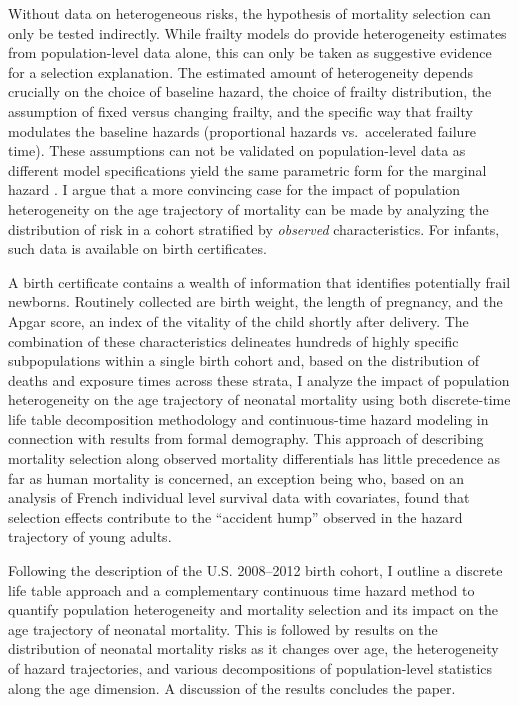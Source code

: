 \documentclass[10pt,twoside,reqno]{article}
\begin{document}
Without data on heterogeneous risks, the hypothesis of mortality selection can only be tested indirectly. While frailty models do provide heterogeneity estimates from population-level data alone, this can only be taken as suggestive evidence for a selection explanation. The estimated amount of heterogeneity depends crucially on the choice of baseline hazard, the choice of frailty distribution, the assumption of fixed versus changing frailty, and the specific way that frailty modulates the baseline hazards (proportional hazards vs.~accelerated failure time). These assumptions can not be validated on population-level data as different model specifications yield the same parametric form for the marginal hazard \citep{Trussell1985, Hoem1990, Yashin2000}. I argue that a more convincing case for the impact of population heterogeneity on the age trajectory of mortality can be made by analyzing the distribution of risk in a cohort stratified by \emph{observed} characteristics. For infants, such data is available on birth certificates.

A birth certificate contains a wealth of information that identifies potentially frail newborns. Routinely collected are birth weight, the length of pregnancy, and the Apgar score, an index of the vitality of the child shortly after delivery. The combination of these characteristics delineates hundreds of highly specific subpopulations within a single birth cohort and, based on the distribution of deaths and exposure times across these strata, I analyze the impact of population heterogeneity on the age trajectory of neonatal mortality using both discrete-time life table decomposition methodology and continuous-time hazard modeling in connection with results from formal demography. This approach of describing mortality selection along observed mortality differentials has little precedence as far as human mortality is concerned, an exception being \citet{Remund2015} who, based on an analysis of French individual level survival data with covariates, found that selection effects contribute to the ``accident hump'' observed in the hazard trajectory of young adults.

Following the description of the U.S. 2008--2012 birth cohort, I outline a discrete life table approach and a complementary continuous time hazard method to quantify population heterogeneity and mortality selection and its impact on the age trajectory of neonatal mortality. This is followed by results on the distribution of neonatal mortality risks as it changes over age, the heterogeneity of hazard trajectories, and various decompositions of population-level statistics along the age dimension. A discussion of the results concludes the paper.
\end{document}
